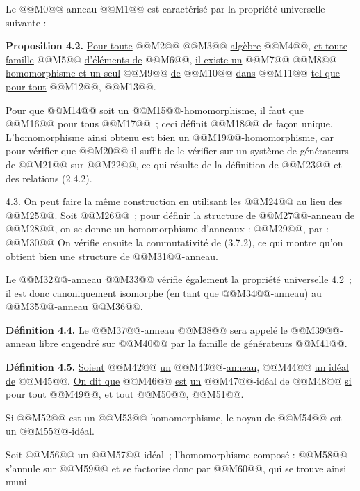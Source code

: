 
Le @@M0@@-anneau @@M1@@ est caractérisé par la propriété universelle suivante :

\textbf{Proposition 4.2.} \uline{Pour toute} @@M2@@-@@M3@@-\uline{algèbre} @@M4@@, \uline{et toute famille} @@M5@@ \uline{d'éléments de} @@M6@@, \uline{il existe un} @@M7@@-@@M8@@-\uline{homomorphisme et un seul} @@M9@@ \uline{de} @@M10@@ \uline{dans} @@M11@@ \uline{tel que pour tout} @@M12@@, @@M13@@.

Pour que @@M14@@ soit un @@M15@@-homomorphisme, il faut que @@M16@@ pour tous @@M17@@~; ceci définit @@M18@@ de façon unique. L'homomorphisme ainsi obtenu est bien un @@M19@@-homomorphisme, car pour vérifier que @@M20@@ il suffit de le vérifier sur un système de générateurs de @@M21@@ sur @@M22@@, ce qui résulte de la définition de @@M23@@ et des relations (2.4.2).

4.3. On peut faire la même construction en utilisant les @@M24@@ au lieu des @@M25@@. Soit @@M26@@~; pour définir la structure de @@M27@@-anneau de @@M28@@, on se donne un homomorphisme d'anneaux : @@M29@@, par :
@@M30@@
On vérifie ensuite la commutativité de (3.7.2), ce qui montre qu'on obtient bien une structure de @@M31@@-anneau.

Le @@M32@@-anneau @@M33@@ vérifie également la propriété universelle 4.2~; il est donc canoniquement isomorphe (en tant que @@M34@@-anneau) au @@M35@@-anneau @@M36@@.

\textbf{Définition 4.4.} \uline{Le} @@M37@@-\uline{anneau} @@M38@@ \uline{sera appelé le} @@M39@@-anneau libre engendré sur @@M40@@ par la famille de générateurs @@M41@@.

\textbf{Définition 4.5.} \uline{Soient} @@M42@@ \uline{un} @@M43@@-\uline{anneau}, @@M44@@ \uline{un idéal de} @@M45@@. \uline{On dit que} @@M46@@ \uline{est} \uline{un} @@M47@@-idéal de @@M48@@ \uline{si pour tout} @@M49@@, \uline{et tout} @@M50@@, @@M51@@.

Si @@M52@@ est un @@M53@@-homomorphisme, le noyau de @@M54@@ est un @@M55@@-idéal.

Soit @@M56@@ un @@M57@@-idéal~; l'homomorphisme composé : @@M58@@ s'annule sur @@M59@@ et se factorise donc par @@M60@@, qui se trouve ainsi muni 
